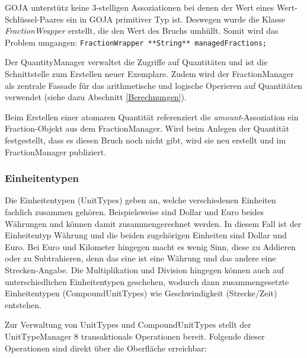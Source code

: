 GOJA unterstütz keine 3-stelligen Assoziationen bei denen der Wert eines Wert-Schlüssel-Paares ein in GOJA primitiver Typ ist. Deswegen wurde die Klasse \textit{FractionWrapper} erstellt, die den Wert des Bruchs umhüllt. Somit wird das Problem umgangen: \texttt{FractionWrapper **String** managedFractions;}


\label{QuantityManager}

Der QuantityManager verwaltet die Zugriffe auf Quantitäten und ist die Schnittstelle zum Erstellen neuer Exemplare.
Zudem wird der FractionManager als zentrale Fassade für das arithmetische und logische Operieren auf Quantitäten verwendet (siehe dazu Abschnitt \ref{Berechnungen}).

Beim Erstellen einer atomaren Quantität referenziert die \textit{amount}-Assoziation ein Fraction-Objekt aus dem FractionManager. Wird beim Anlegen der Quantität festgestellt, dass es diesen Bruch noch nicht gibt,
wird sie neu erstellt und im FractionManager publiziert. 

\subsubsection{Einheitentypen}
Die Einheitentypen (UnitTypes) geben an, welche verschiedenen Einheiten fachlich zusammen gehören. Beispielsweise sind Dollar und Euro beides Währungen und können damit zusammengerechnet werden. In diesem Fall ist der Einheitentyp Währung und die beiden zugehörigen Einheiten sind Dollar und Euro. Bei Euro und Kilometer hingegen macht es wenig Sinn, diese zu Addieren oder zu Subtrahieren, denn das eine ist eine Währung und das andere eine Strecken-Angabe. Die Multiplikation und Division hingegen können auch auf unterschiedlichen Einheitentypen geschehen, wodurch dann zusammengesetzte Einheitentypen (CompoundUnitTypes) wie Geschwindigkeit (Strecke/Zeit) entstehen.

Zur Verwaltung von UnitTypes und CompoundUnitTypes stellt der UnitTypeManager 8 transaktionale Operationen bereit. Folgende dieser Operationen sind direkt über die Oberfläche erreichbar:

